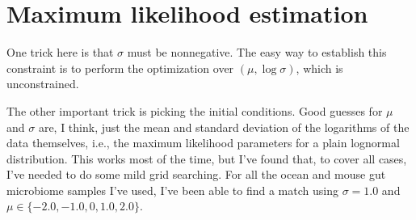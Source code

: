 \documentclass[10pt]{article}
\begin{document}
\section{Maximum likelihood estimation}
One trick here is that $\sigma$ must be nonnegative. The easy way to establish this
constraint is to perform the optimization over $(\mu, \log \sigma)$, which is unconstrained.

The other important trick is picking the initial conditions. Good guesses for $\mu$ and
$\sigma$ are, I think, just the mean and standard deviation of the logarithms of the data
themselves, i.e., the maximum likelihood parameters for a plain lognormal distribution.
This works most of the time, but I've found that, to cover all cases, I've needed to do some
mild grid searching. For all the ocean and mouse gut microbiome samples I've used, I've been
able to find a match using $\sigma = 1.0$ and $\mu \in \{-2.0, -1.0, 0, 1.0, 2.0\}$.
\end{document}
